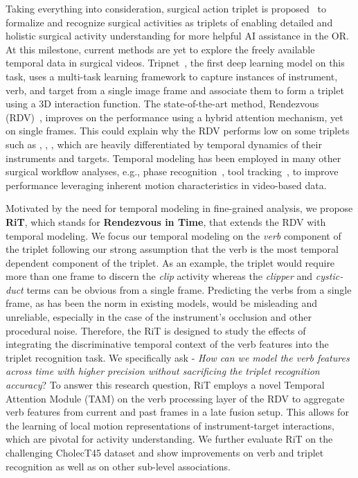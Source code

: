 \documentclass{article}
\begin{document}
Taking everything into consideration, surgical action triplet is proposed~\cite{katic2014knowledge,tripnet} to formalize and recognize surgical activities as triplets of \textrangle{} enabling detailed and holistic surgical activity understanding for more helpful AI assistance in the OR. At this milestone, current methods are yet to explore the freely available temporal data in surgical videos. Tripnet~\cite{tripnet}, the first deep learning model on this task, uses a multi-task learning framework to capture instances of instrument, verb, and target from a single image frame and associate them to form a triplet using a 3D interaction function. The state-of-the-art method, Rendezvous (RDV)~\cite{rdv}, improves on the performance using a hybrid attention mechanism, yet on single frames. This could explain why the RDV performs low on some triplets such as \textrangle{}, \textrangle{}, \textrangle{}, which are heavily differentiated by temporal dynamics of their instruments and targets. 
Temporal modeling has been employed in many other surgical workflow analyses, e.g., phase recognition~\cite{tecno,mtrcnetcl}, tool tracking~\cite{lstmtool}, to improve performance leveraging inherent motion characteristics in video-based data.


Motivated by the need for temporal modeling in fine-grained analysis, we propose \textbf{RiT}, which stands for \textbf{Rendezvous in Time}, that extends the RDV with temporal modeling.
We focus our temporal modeling on the \textit{verb} component of the triplet following our strong assumption that the verb is the most temporal dependent component of the triplet.
As an example, the triplet \textrangle{} would require more than one frame to discern the \textit{clip} activity whereas the \textit{clipper} and \textit{cystic-duct} terms can be obvious from a single frame.
Predicting the verbs from a single frame, as has been the norm in existing models, would be misleading and unreliable, especially in the case of the instrument's occlusion and other procedural noise.
Therefore, the RiT is designed to study the effects of integrating the discriminative temporal context of the verb features into the triplet recognition task. 
We specifically ask - \textit{How can we model the verb features across time with higher precision without sacrificing the triplet recognition accuracy}? 
To answer this research question, RiT employs a novel Temporal Attention Module (TAM) on the verb processing layer of the RDV to aggregate verb features from current and past frames in a late fusion setup. This allows for the learning of local motion representations of instrument-target interactions, which are pivotal for activity understanding.
We further evaluate RiT on the challenging CholecT45 dataset \cite{rdv} and show improvements on verb and triplet recognition as well as on other sub-level associations.
\end{document}
